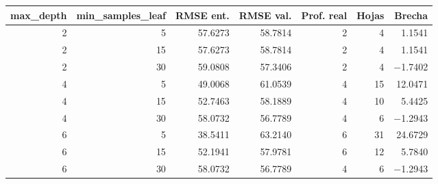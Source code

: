 \begin{tabular}{rrrrrrr}
\toprule
max\_depth & min\_samples\_leaf & RMSE ent. & RMSE val. & Prof. real & Hojas & Brecha \\
\midrule
2 & 5 & 57.6273 & 58.7814 & 2 & 4 & 1.1541 \\
2 & 15 & 57.6273 & 58.7814 & 2 & 4 & 1.1541 \\
2 & 30 & 59.0808 & 57.3406 & 2 & 4 & $-$1.7402 \\
4 & 5 & 49.0068 & 61.0539 & 4 & 15 & 12.0471 \\
4 & 15 & 52.7463 & 58.1889 & 4 & 10 & 5.4425 \\
4 & 30 & 58.0732 & 56.7789 & 4 & 6 & $-$1.2943 \\
6 & 5 & 38.5411 & 63.2140 & 6 & 31 & 24.6729 \\
6 & 15 & 52.1941 & 57.9781 & 6 & 12 & 5.7840 \\
6 & 30 & 58.0732 & 56.7789 & 4 & 6 & $-$1.2943 \\
\bottomrule
\end{tabular}
